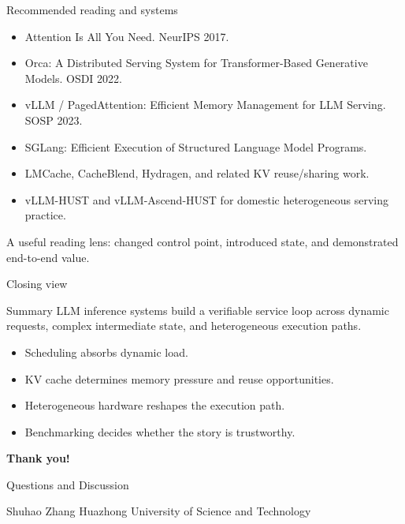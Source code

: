 \documentclass[aspectratio=169,11pt]{beamer}
\newcommand{\smallnote}[1]{\textcolor{HUSTGray}{\footnotesize #1}}
\begin{document}
\fi

\begin{frame}{Recommended reading and systems}
  \begin{itemize}
    \item Attention Is All You Need. NeurIPS 2017.
    \item Orca: A Distributed Serving System for Transformer-Based Generative Models. OSDI 2022.
    \item vLLM / PagedAttention: Efficient Memory Management for LLM Serving. SOSP 2023.
    \item SGLang: Efficient Execution of Structured Language Model Programs.
    \item LMCache, CacheBlend, Hydragen, and related KV reuse/sharing work.
    \item vLLM-HUST and vLLM-Ascend-HUST for domestic heterogeneous serving practice.
  \end{itemize}
  \vspace{0.2cm}
  \smallnote{A useful reading lens: changed control point, introduced state, and demonstrated end-to-end value.}
\end{frame}

\begin{frame}{Closing view}
  \begin{block}{Summary}
    LLM inference systems build a verifiable service loop across dynamic requests, complex intermediate state, and heterogeneous execution paths.
  \end{block}
  \begin{itemize}
    \item Scheduling absorbs dynamic load.
    \item KV cache determines memory pressure and reuse opportunities.
    \item Heterogeneous hardware reshapes the execution path.
    \item Benchmarking decides whether the story is trustworthy.
  \end{itemize}
\end{frame}

\begin{frame}[plain]
  \vspace{1.25cm}
  \centering
  {\Huge\bfseries\textcolor{HUSTBlue}{Thank you!}}\par
  \vspace{0.35cm}
  {\Large Questions and Discussion}\par
  \vspace{0.8cm}
  \textcolor{HUSTGray}{Shuhao Zhang \quad Huazhong University of Science and Technology}
\end{frame}
\end{document}
